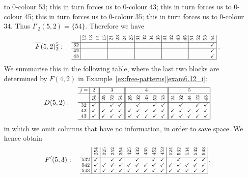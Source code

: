 \documentclass[ALCO,ThmDefs,Unicode,epreuves]{cedram}
\newcommand{\ov}{\overline}
\newcommand{\cm}{\checkmark}
\newcommand{\rt}[1]{\rotatebox{90}{#1}}
\begin{document}
\begin{exam}
to 0-colour 53; this in turn forces us to 0-colour 43; this in turn
forces us to 0-colour 45; this in turn forces us to 0-colour 35; this
in turn forces us to 0-colour 34. Thus $I'_{2}(5,2)=\{54\}$.
Therefore we have
\[ 
\ov{F}(5,2)^5_2: \quad
\text{\setlength{\arraycolsep}{2.7pt}\scriptsize
$\displaystyle 
\begin{array}{c|cccc|cccc|cccc|cccc|cccc|}
 &\rt{12}&\rt{13}&\rt{14}&\rt{15}&\rt{21} &\rt{23}&\rt{24}&\rt{25}&\rt{31}&\rt{32} &\rt{34}&\rt{35}&\rt{41}&\rt{42}&\rt{43} &\rt{45} 
 &\rt{51}&\rt{52}&\rt{53} &\rt{54} \\ \hline 
 32 	&&&&			&&&&			&& &	&&& &	&		&&&&\cm							\\ \hline
 42 	&&&&			&&&&			&& && && &	&		&&&&\cm				\\ 
 43 	&&&&			&&&&			&& && && &	&		&&&&	\cm						\\ 
 \hline
\end{array}\; .$}
\]
We summarise this in the following table, where the last two blocks
are determined by $F(4,2)$ in Example~\ref{ex:free-patterns}\ref{exam6.12_i}:
\[
D(5,2): \quad
\text{\setlength{\arraycolsep}{2.7pt}\scriptsize
$\displaystyle 
\begin{array}{c|c||ccc||ccccc||ccccc|}
\hline j=&{2}	
&\multicolumn{3}{c||}{3}
&\multicolumn{5}{c||}{4}
&\multicolumn{5}{c|}{5}					\\ \hline 
 &\rt{54}&\rt{25}&\rt{52}&\rt{54}%
 &\rt{25}&\rt{32}&\rt{35}&\rt{52}%
 &\rt{53}&\rt{24 }&\rt{32 }&\rt{34 }%
 &\rt{42}&\rt{43}\\ 
 \hline
 32 &\cm &&\cm&\cm &&\cm&&\cm&\cm &&\cm&&\cm&\cm \\ 
 42 &\cm &\cm&\cm&\cm &\cm&\cm&\cm&\cm&\cm &\cm&\cm&\cm&\cm&\cm \\
 43 &\cm &\cm&\cm&\cm &\cm&\cm&\cm&\cm&\cm &\cm&\cm&\cm&\cm&\cm \\ \hline
\end{array}\,$}
\]
in which we omit columns that have no information, in order to save space.
We hence obtain 
\[
 F' (5,3): \quad
\text{\setlength{\arraycolsep}{2.7pt}\scriptsize
$\displaystyle 
\begin{array}{c|c|ccc|ccccc|ccccc|}
 &\rt{254}&\rt{325}&\rt{352}&\rt{354}%
 &\rt{425}&\rt{432}&\rt{435}&\rt{452}%
 &\rt{453}&\rt{524}&\rt{532}&\rt{534}%
 &\rt{542}&\rt{543}\\ \hline
 532 &\cm &&\cm&\cm &&\cm&&\cm&\cm &&\cm&&\cm&\cm \\ 
 542 &\cm &\cm&\cm&\cm &\cm&\cm&\cm&\cm&\cm &\cm&\cm&\cm&\cm&\cm \\
 543 &\cm &\cm&\cm&\cm &\cm&\cm&\cm&\cm&\cm &\cm&\cm&\cm&\cm&\cm \\ \hline
\end{array}\,.$}
\] 
\end{exam}
\end{document}
